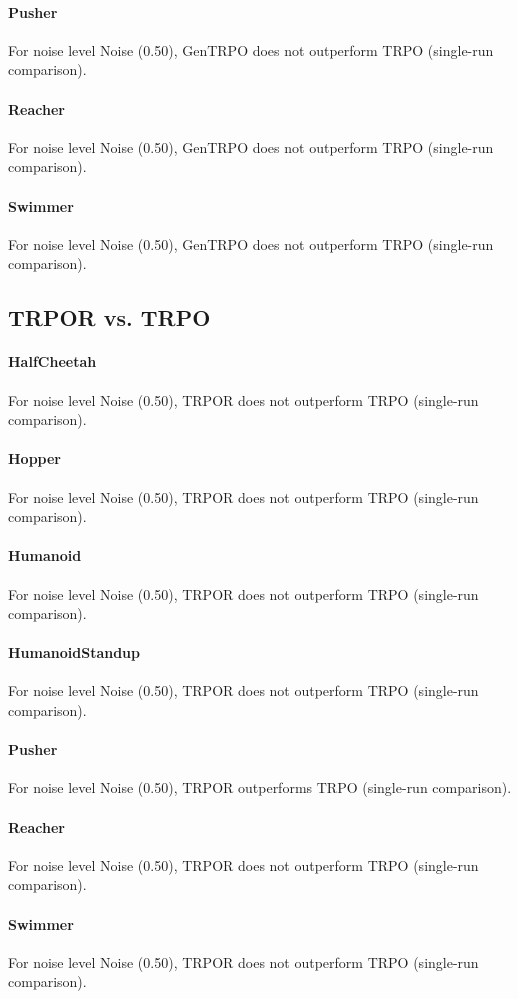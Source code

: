 \paragraph{Pusher}
For noise level Noise (0.50), GenTRPO does not outperform TRPO (single-run comparison).
\paragraph{Reacher}
For noise level Noise (0.50), GenTRPO does not outperform TRPO (single-run comparison).
\paragraph{Swimmer}
For noise level Noise (0.50), GenTRPO does not outperform TRPO (single-run comparison).
\subsection{TRPOR vs. TRPO}
\paragraph{HalfCheetah}
For noise level Noise (0.50), TRPOR does not outperform TRPO (single-run comparison).
\paragraph{Hopper}
For noise level Noise (0.50), TRPOR does not outperform TRPO (single-run comparison).
\paragraph{Humanoid}
For noise level Noise (0.50), TRPOR does not outperform TRPO (single-run comparison).
\paragraph{HumanoidStandup}
For noise level Noise (0.50), TRPOR does not outperform TRPO (single-run comparison).
\paragraph{Pusher}
For noise level Noise (0.50), TRPOR outperforms TRPO (single-run comparison).
\paragraph{Reacher}
For noise level Noise (0.50), TRPOR does not outperform TRPO (single-run comparison).
\paragraph{Swimmer}
For noise level Noise (0.50), TRPOR does not outperform TRPO (single-run comparison).
